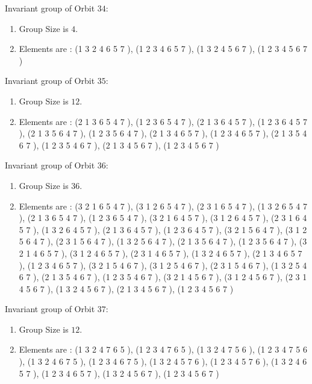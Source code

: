 \documentclass[12pt]{article}
\begin{document}
Invariant group of Orbit $34$:
\begin{enumerate}
\item Group Size is $4$.
\item Elements are : (1 3 2 4 6 5 7  ), (1 2 3 4 6 5 7  ), (1 3 2 4 5 6 7  ), (1 2 3 4 5 6 7  )
\end{enumerate}
Invariant group of Orbit $35$:
\begin{enumerate}
\item Group Size is $12$.
\item Elements are : (2 1 3 6 5 4 7  ), (1 2 3 6 5 4 7  ), (2 1 3 6 4 5 7  ), (1 2 3 6 4 5 7  ), (2 1 3 5 6 4 7  ), (1 2 3 5 6 4 7  ), (2 1 3 4 6 5 7  ), (1 2 3 4 6 5 7  ), (2 1 3 5 4 6 7  ), (1 2 3 5 4 6 7  ), (2 1 3 4 5 6 7  ), (1 2 3 4 5 6 7  )
\end{enumerate}
Invariant group of Orbit $36$:
\begin{enumerate}
\item Group Size is $36$.
\item Elements are : (3 2 1 6 5 4 7  ), (3 1 2 6 5 4 7  ), (2 3 1 6 5 4 7  ), (1 3 2 6 5 4 7  ), (2 1 3 6 5 4 7  ), (1 2 3 6 5 4 7  ), (3 2 1 6 4 5 7  ), (3 1 2 6 4 5 7  ), (2 3 1 6 4 5 7  ), (1 3 2 6 4 5 7  ), (2 1 3 6 4 5 7  ), (1 2 3 6 4 5 7  ), (3 2 1 5 6 4 7  ), (3 1 2 5 6 4 7  ), (2 3 1 5 6 4 7  ), (1 3 2 5 6 4 7  ), (2 1 3 5 6 4 7  ), (1 2 3 5 6 4 7  ), (3 2 1 4 6 5 7  ), (3 1 2 4 6 5 7  ), (2 3 1 4 6 5 7  ), (1 3 2 4 6 5 7  ), (2 1 3 4 6 5 7  ), (1 2 3 4 6 5 7  ), (3 2 1 5 4 6 7  ), (3 1 2 5 4 6 7  ), (2 3 1 5 4 6 7  ), (1 3 2 5 4 6 7  ), (2 1 3 5 4 6 7  ), (1 2 3 5 4 6 7  ), (3 2 1 4 5 6 7  ), (3 1 2 4 5 6 7  ), (2 3 1 4 5 6 7  ), (1 3 2 4 5 6 7  ), (2 1 3 4 5 6 7  ), (1 2 3 4 5 6 7  )
\end{enumerate}
Invariant group of Orbit $37$:
\begin{enumerate}
\item Group Size is $12$.
\item Elements are : (1 3 2 4 7 6 5  ), (1 2 3 4 7 6 5  ), (1 3 2 4 7 5 6  ), (1 2 3 4 7 5 6  ), (1 3 2 4 6 7 5  ), (1 2 3 4 6 7 5  ), (1 3 2 4 5 7 6  ), (1 2 3 4 5 7 6  ), (1 3 2 4 6 5 7  ), (1 2 3 4 6 5 7  ), (1 3 2 4 5 6 7  ), (1 2 3 4 5 6 7  )
\end{enumerate}
\end{document}
